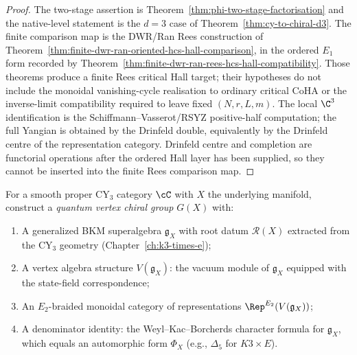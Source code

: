 \begin{proof}
The two-stage assertion is Theorem~\ref{thm:phi-two-stage-factorisation}
and the native-level statement is the \(d=3\) case of
Theorem~\ref{thm:cy-to-chiral-d3}.  The finite comparison map is the
DWR/Ran Rees construction of
Theorem~\ref{thm:finite-dwr-ran-oriented-hcs-hall-comparison}, in the
ordered \(E_1\) form recorded by
Theorem~\ref{thm:finite-dwr-ran-rees-hcs-hall-compatibility}.  Those
theorems produce a finite Rees critical Hall target; their hypotheses do
not include the monoidal vanishing-cycle realisation to ordinary
critical CoHA or the inverse-limit compatibility required to leave fixed
\((N,r,L,m)\).  The local \(\C^3\) identification is the
Schiffmann--Vasserot/RSYZ positive-half computation; the full Yangian is
obtained by the Drinfeld double, equivalently by the Drinfeld centre of
the representation category.  Drinfeld centre and completion are
functorial operations after the ordered Hall layer has been supplied, so
they cannot be inserted into the finite Rees comparison map.
\end{proof}

\begin{problem}
\label{prob:qvcg-construction}
For a smooth proper CY$_3$ category $\cC$ with $X$ the underlying
manifold, construct a \emph{quantum vertex chiral group} \(G(X)\) with:
\begin{enumerate}[label=(\alph*)]
 \item A generalized BKM superalgebra $\mathfrak{g}_X$ with root datum $\mathcal{R}(X)$ extracted from the CY$_3$ geometry (Chapter~\ref{ch:k3-times-e});
 \item A vertex algebra structure $V(\mathfrak{g}_X)$: the vacuum module of $\mathfrak{g}_X$ equipped with the state-field correspondence;
 \item An $E_2$-braided monoidal category of representations $\Rep^{E_2}(V(\mathfrak{g}_X))$;
 \item A denominator identity: the Weyl--Kac--Borcherds character formula for $\mathfrak{g}_X$, which equals an automorphic form $\Phi_X$ (e.g., $\Delta_5$ for $K3 \times E$).
\end{enumerate}
\end{problem}

